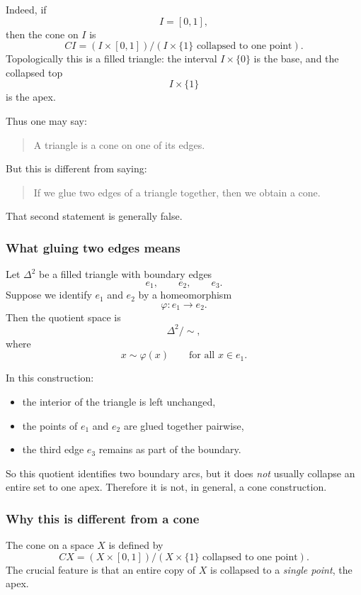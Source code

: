 \documentclass[12pt,a4paper]{article}
\theoremstyle{notespace}
\begin{document}
Indeed, if
\[
I=[0,1],
\]
then the cone on \(I\) is
\[
CI=(I\times[0,1])/(I\times\{1\}\text{ collapsed to one point}).
\]
Topologically this is a filled triangle: the interval \(I\times\{0\}\) is the base, and the collapsed top
\[
I\times\{1\}
\]
is the apex.

Thus one may say:

\begin{quote}
	A triangle is a cone on one of its edges.
\end{quote}

But this is different from saying:

\begin{quote}
	If we glue two edges of a triangle together, then we obtain a cone.
\end{quote}

That second statement is generally false.

\subsubsection{What gluing two edges means}

Let \(\Delta^2\) be a filled triangle with boundary edges
\[
e_1,\qquad e_2,\qquad e_3.
\]
Suppose we identify \(e_1\) and \(e_2\) by a homeomorphism
\[
\varphi:e_1\to e_2.
\]
Then the quotient space is
\[
\Delta^2/\!\sim,
\]
where
\[
x\sim \varphi(x)
\qquad
\text{for all }x\in e_1.
\]

In this construction:

\begin{itemize}
	\item the interior of the triangle is left unchanged,
	\item the points of \(e_1\) and \(e_2\) are glued together pairwise,
	\item the third edge \(e_3\) remains as part of the boundary.
\end{itemize}

So this quotient identifies two boundary arcs, but it does \emph{not} usually collapse an entire set to one apex. Therefore it is not, in general, a cone construction.

\subsubsection{Why this is different from a cone}

The cone on a space \(X\) is defined by
\[
CX=(X\times[0,1])/(X\times\{1\}\text{ collapsed to one point}).
\]
The crucial feature is that an entire copy of \(X\) is collapsed to a \emph{single point}, the apex.
\end{document}
